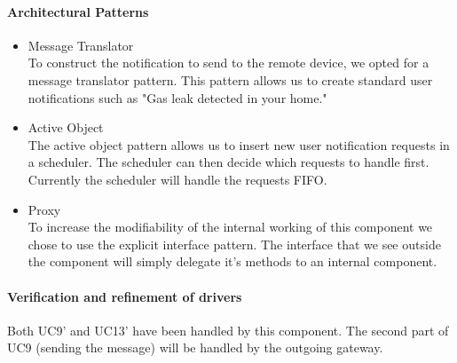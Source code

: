 \paragraph{Architectural Patterns}
\begin{itemize}
	\item Message Translator \\
	To construct the notification to send to the remote device, we opted for
		a message translator pattern. This pattern allows us to create standard
		user notifications such as "Gas leak detected in your home."
	\item Active Object \\
	The active object pattern allows us to insert new user notification requests in a scheduler. The scheduler can
		then decide which requests to handle first.  Currently the scheduler will handle
		the requests FIFO.
	\item Proxy \\
	To increase the modifiability of the internal working of this component we chose
		to use the explicit interface pattern. The interface that we see outside the
		component will simply delegate it's methods to an internal component.
\end{itemize}


\paragraph{Verification and refinement of drivers}
Both UC9' and UC13' have been handled by this component. The second part of
UC9 (sending the message) will be handled by the outgoing gateway.
